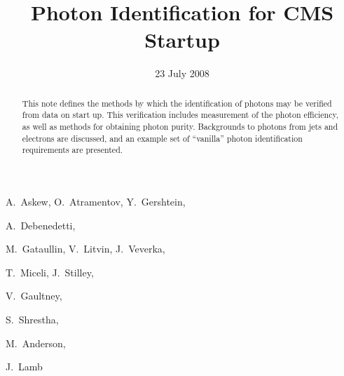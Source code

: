 \documentclass{cmspaper}
\begin{document}

\begin{titlepage}

   \date{23 July 2008}

  \title{Photon Identification for CMS Startup}

  \begin{Authlist}
    A.~Askew, O.~Atramentov, Y.~Gershtein,

    A.~Debenedetti,

    M.~Gataullin, V.~Litvin, J.~Veverka, 

    T.~Miceli, J.~Stilley,

    V.~Gaultney,

    S.~Shrestha,

    M.~Anderson,

    J.~Lamb

  \end{Authlist}


  \begin{abstract}
This note defines the methods by which the identification of photons may be verified from data
on start up.  This verification includes measurement of the photon efficiency, as well as methods
for obtaining photon purity.  Backgrounds to photons from jets and electrons are discussed, and an
example set of ``vanilla'' photon identification requirements are presented. 
  \end{abstract} 

  
\end{titlepage}
\tableofcontents
\listoffigures
\listoftables
\pagebreak
\end{document}
